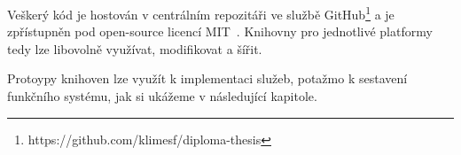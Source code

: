 Veškerý kód je hostován v centrálním repozitáři
ve službě GitHub\footnote{
https://github.com/klimesf/diploma-thesis
} a je zpřístupněn pod open-source licencí MIT~\cite{mitlicense}.
Knihovny pro jednotlivé platformy tedy lze libovolně
využívat, modifikovat a šířit.

Protoypy knihoven lze využít k implementaci služeb,
potažmo k sestavení funkčního systému, jak si ukážeme
v následující kapitole.
